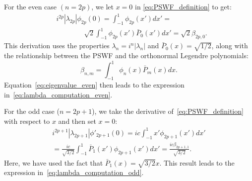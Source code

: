 \documentclass[lettersize,journal]{IEEEtran}
\theoremstyle{plain}
\begin{document}
For the even case $(n = 2p)$, we let $x = 0$ in \eqref{eq:PSWF_definition} to get:
\begin{align}
	&i^{2p}|\lambda_{2p}|\phi_{2p}(0) = \int_{-1}^{1}\phi_{2p}(x')dx' = \nonumber \\ &\qquad\qquad\sqrt{2}\int_{-1}^{1}\phi_{2p}(x')\bar{P}_0(x')dx'
	= \sqrt{2}\beta_{2p, 0}.
	\label{eq:eigenvalue_even}
\end{align}
This derivation uses the properties $\lambda_n = i^n |\lambda_n|$ and $\bar{P}_0(x) = \sqrt{1/2}$, along with the relationship between the PSWF and the orthonormal Legendre polynomials:
$$
	\beta_{n, m} = \int_{-1}^{1}\phi_n(x)\bar{P}_m(x)dx.
	\label{eq:beta_n_k}
$$
Equation~\eqref{eq:eigenvalue_even} then leads to the expression in~\eqref{eq:lambda_computation_even}. 

For the odd case ($n = 2p+1$), we take the derivative of~\eqref{eq:PSWF_definition} with respect to $x$ and then set $x = 0$:
\begin{align}
	i^{2p+1}|\lambda_{2p+1}|\phi'_{2p+1}(0) = ic\int_{-1}^{1}x'\phi_{2p+1}(x')dx' \nonumber \\
	= \frac{ic}{\sqrt{3/2}}\int_{-1}^{1}\bar{P}_1(x')\phi_{2p+1}(x')dx' = \frac{ic \beta_{2p+1, 1}}{\sqrt{3/2}}.\nonumber
\end{align}
Here, we have used the fact that $\bar{P}_1(x) = \sqrt{3/2} x$. This result leads to the expression in~\eqref{eq:lambda_computation_odd}.
	
	
\end{document}
